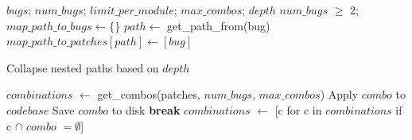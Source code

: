 \begin{algorithm}
\begin{algorithmic}
\Require $bugs$; $num\_bugs$; $limit\_per\_module$; $max\_combos$; $depth$
\Ensure $num\_bugs$ $\geq$ 2;
\State $map\_path\_to\_bugs \gets \{\}$
        \State $path \gets$ get\_path\_from(bug)
        \State $map\_path\_to\_patches[path] \gets [bug]$
    \EndFor

    \State Collapse nested paths based on $depth$
    
        \State $combinations$ $\gets$ get\_combos(patches, $num\_bugs$, $max\_combos$)
            \State Apply $combo$ to $codebase$
                \State Save $combo$ to disk
                    \State \textbf{break}
                \EndIf
                \State $combinations$ $\gets$ [c for c in $combinations$ if c $\cap$ $combo$ $=\emptyset$]
            \EndIf
        \EndFor
    \EndFor
\EndProcedure
\caption{Combine multiple patches from the same module.}
\label{alg:combine_module}
\end{algorithmic}
\end{algorithm}
